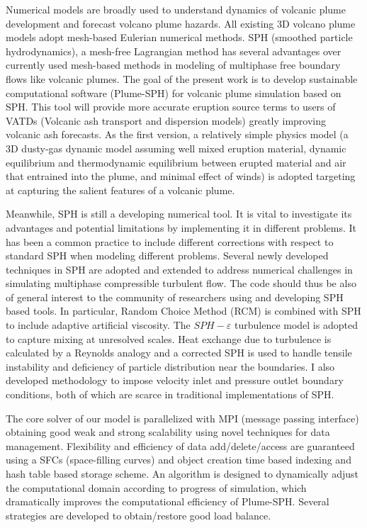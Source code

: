 Numerical models are broadly used to understand dynamics of volcanic plume development and forecast volcano plume hazards. All existing 3D volcano plume models adopt mesh-based Eulerian numerical methods. 
SPH (smoothed particle hydrodynamics), a mesh-free Lagrangian method has several advantages over currently used mesh-based methods in modeling of multiphase free boundary flows like volcanic plumes. The goal of the present work is to develop sustainable computational software (Plume-SPH) for volcanic plume simulation based on SPH.
This tool will provide more accurate eruption source terms to users of VATDs (Volcanic ash transport and dispersion models) greatly improving volcanic ash forecasts.
As the first version, a relatively simple physics model (a 3D dusty-gas dynamic model assuming well mixed eruption material, dynamic equilibrium and thermodynamic equilibrium between erupted material and air that entrained into the plume, and minimal effect of winds) is adopted targeting at capturing the salient features of a volcanic plume. 
 
Meanwhile, SPH is still a developing numerical tool. It is vital to investigate its advantages and potential limitations by implementing it in different problems. It has been a common practice to include different corrections with respect to standard SPH when modeling different problems. Several newly developed techniques in SPH are adopted and extended to address numerical challenges in simulating multiphase compressible turbulent flow. The code should thus be also of general interest to the community of researchers using and developing SPH based tools. In particular, Random Choice Method (RCM) is combined with SPH to include adaptive artificial viscosity. The $SPH-\varepsilon$ turbulence model is adopted to capture mixing at unresolved scales. Heat exchange due to turbulence is calculated by a Reynolds analogy and a corrected SPH is used to handle tensile instability and deficiency of particle distribution near the boundaries. I also developed methodology to impose velocity inlet and pressure outlet boundary conditions, both of which are scarce in traditional implementations of SPH.

The core solver of our model is parallelized with MPI (message passing interface) obtaining good weak and strong scalability using novel techniques for data management. Flexibility and efficiency of data add/delete/access are guaranteed using a SFCs (space-filling curves) and object creation time based indexing and hash table based storage scheme. An algorithm is designed to dynamically adjust the computational domain according to progress of simulation, which dramatically improves the computational efficiency of Plume-SPH. Several strategies are developed to obtain/restore good load balance.

